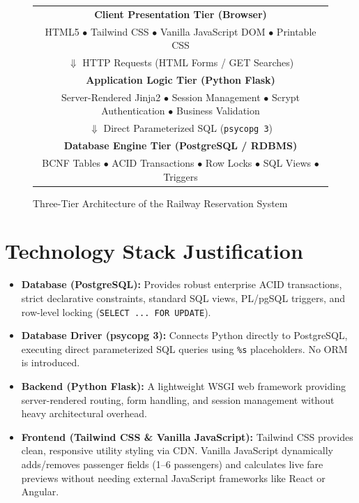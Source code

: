 \documentclass[12pt,a4paper]{report}
\begin{document}
\begin{figure}[H]
    \centering
    \begin{tabular}{|c|}
        \hline
        \textbf{Client Presentation Tier (Browser)} \\
        HTML5 $\bullet$ Tailwind CSS $\bullet$ Vanilla JavaScript DOM $\bullet$ Printable CSS \\
        \hline
        $\Downarrow$ \small HTTP Requests (HTML Forms / GET Searches) \\
        \hline
        \textbf{Application Logic Tier (Python Flask)} \\
        Server-Rendered Jinja2 $\bullet$ Session Management $\bullet$ Scrypt Authentication $\bullet$ Business Validation \\
        \hline
        $\Downarrow$ \small Direct Parameterized SQL (\texttt{psycopg 3}) \\
        \hline
        \textbf{Database Engine Tier (PostgreSQL / RDBMS)} \\
        BCNF Tables $\bullet$ ACID Transactions $\bullet$ Row Locks $\bullet$ SQL Views $\bullet$ Triggers \\
        \hline
    \end{tabular}
    \caption{Three-Tier Architecture of the Railway Reservation System}
    \label{fig:arch}
\end{figure}

\section{Technology Stack Justification}
\begin{itemize}
    \item \textbf{Database (PostgreSQL):} Provides robust enterprise ACID transactions, strict declarative constraints, standard SQL views, PL/pgSQL triggers, and row-level locking (\texttt{SELECT ... FOR UPDATE}).
    \item \textbf{Database Driver (psycopg 3):} Connects Python directly to PostgreSQL, executing direct parameterized SQL queries using \texttt{\%s} placeholders. No ORM is introduced.
    \item \textbf{Backend (Python Flask):} A lightweight WSGI web framework providing server-rendered routing, form handling, and session management without heavy architectural overhead.
    \item \textbf{Frontend (Tailwind CSS \& Vanilla JavaScript):} Tailwind CSS provides clean, responsive utility styling via CDN. Vanilla JavaScript dynamically adds/removes passenger fields (1--6 passengers) and calculates live fare previews without needing external JavaScript frameworks like React or Angular.
\end{itemize}
\end{document}
